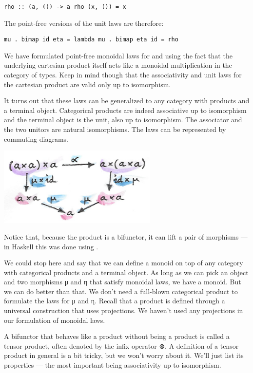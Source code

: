 \begin{verbatim}
rho :: (a, ()) -> a rho (x, ()) = x
\end{verbatim}

The point-free versions of the unit laws are therefore:

\begin{verbatim}
mu . bimap id eta = lambda mu . bimap eta id = rho
\end{verbatim}

We have formulated point-free monoidal laws for  and
 using the fact that the underlying cartesian product itself
acts like a monoidal multiplication in the category of types. Keep in
mind though that the associativity and unit laws for the cartesian
product are valid only up to isomorphism.

It turns out that these laws can be generalized to any category with
products and a terminal object. Categorical products are indeed
associative up to isomorphism and the terminal object is the unit, also
up to isomorphism. The associator and the two unitors are natural
isomorphisms. The laws can be represented by commuting diagrams.

\includegraphics[width=3.12500in]{images/assocmon.png}

Notice that, because the product is a bifunctor, it can lift a pair of
morphisms --- in Haskell this was done using .

We could stop here and say that we can define a monoid on top of any
category with categorical products and a terminal object. As long as we
can pick an object  and two morphisms μ and η that satisfy
monoidal laws, we have a monoid. But we can do better than that. We
don't need a full-blown categorical product to formulate the laws for μ
and η. Recall that a product is defined through a universal construction
that uses projections. We haven't used any projections in our
formulation of monoidal laws.

A bifunctor that behaves like a product without being a product is
called a tensor product, often denoted by the infix operator ⊗. A
definition of a tensor product in general is a bit tricky, but we won't
worry about it. We'll just list its properties --- the most important
being associativity up to isomorphism.


